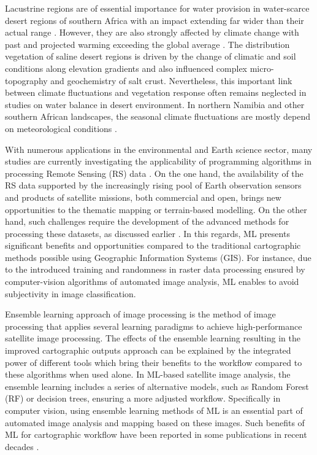 \documentclass[climate,article,submit,pdftex,moreauthors]{Definitions/mdpi}
\begin{document}
{{Lacustrine regions are of essential importance for water provision in water-scarce desert regions of southern Africa with an impact extending far wider than their actual range} \cite{Eicker}. { However, they are also strongly affected by climate change with past and projected warming exceeding the global average} \cite{Thompson}. {The distribution vegetation of saline desert regions is driven by the change of climatic and soil conditions along elevation gradients and also influenced complex micro-topography and geochemistry of salt crust. Nevertheless, this important link between climate fluctuations and vegetation response often remains neglected in studies on water balance in desert environment. In northern Namibia and other southern African landscapes, the seasonal climate fluctuations are mostly depend on meteorological conditions} \cite{Gebrechorkos,Colosi,Prigent}.

With numerous applications in the environmental and Earth science sector, many studies are currently investigating the applicability of programming algorithms in processing Remote Sensing (RS) data \cite{10080513,10334172,Lemenkova202227,9964623,jimaging9050098,9393066}. On the one hand, the availability of the RS data supported by the increasingly rising pool of Earth observation sensors and products of satellite missions, both commercial and open, brings new opportunities to the thematic mapping {or terrain-based modelling}. On the other hand, such challenges require the development of the advanced methods for processing these datasets, as discussed earlier \cite{JASIEWICZ20111525}. In this regards, ML presents significant benefits and opportunities compared to the traditional cartographic methods possible using Geographic Information Systems (GIS). For instance, due to the introduced training and randomness in raster data processing ensured by computer-vision algorithms of automated image analysis, ML enables to avoid subjectivity in image classification.{ } 

Ensemble learning approach of image processing is the method of image processing that applies several learning paradigms to achieve high-performance satellite image processing. The effects of the ensemble learning resulting in the improved cartographic outputs approach can be explained by the integrated power of different tools which bring their benefits to the workflow compared to these algorithms when used alone. {In }ML-based satellite image analysis, the ensemble learning includes a series of alternative models, such as {Random Forest} (RF) or decision trees, ensuring a more adjusted workflow. Specifically in computer vision, using ensemble learning methods of ML is an essential part of automated image analysis and mapping based on these images. Such benefits of ML for cartographic workflow have been reported in some publications in recent decades \cite{YOO2019155,SINGH2021100624,MULIK2023106697}. 

}
\end{document}
